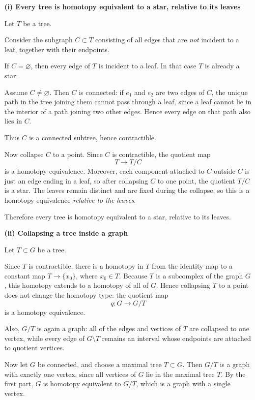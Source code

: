 \begin{solution}

\medskip
\noindent\textbf{(i) Every tree is homotopy equivalent to a star, relative to its leaves}\par
\smallskip

Let \(T\) be a tree.

Consider the subgraph \(C\subset T\) consisting of all edges that are \emph{not} incident to a leaf, together with their endpoints.

If \(C=\varnothing\), then every edge of \(T\) is incident to a leaf. In that case \(T\) is already a star.

Assume \(C\neq \varnothing\). Then \(C\) is connected: if \(e_1\) and \(e_2\) are two edges of \(C\), the unique path in the tree joining them cannot pass through a leaf, since a leaf cannot lie in the interior of a path joining two other edges. Hence every edge on that path also lies in \(C\).

Thus \(C\) is a connected subtree, hence contractible.

Now collapse \(C\) to a point. Since \(C\) is contractible, the quotient map
\[
T \longrightarrow T/C
\]
is a homotopy equivalence. Moreover, each component attached to \(C\) outside \(C\) is just an edge ending in a leaf, so after collapsing \(C\) to one point, the quotient \(T/C\) is a star. The leaves remain distinct and are fixed during the collapse, so this is a homotopy equivalence \emph{relative to the leaves}.

Therefore every tree is homotopy equivalent to a star, relative to its leaves.


\medskip
\noindent\textbf{(ii) Collapsing a tree inside a graph}\par
\smallskip

Let \(T\subset G\) be a tree.

Since \(T\) is contractible, there is a homotopy in \(T\) from the identity map to a constant map \(T\to \{x_0\}\), where \(x_0\in T\). Because \(T\) is a subcomplex of the graph \(G\), this homotopy extends to a homotopy of all of \(G\). Hence collapsing \(T\) to a point does not change the homotopy type: the quotient map
\[
q:G\longrightarrow G/T
\]
is a homotopy equivalence.

Also, \(G/T\) is again a graph: all of the edges and vertices of \(T\) are collapsed to one vertex, while every edge of \(G\setminus T\) remains an interval whose endpoints are attached to quotient vertices.

Now let \(G\) be connected, and choose a maximal tree \(T\subset G\). Then \(G/T\) is a graph with exactly one vertex, since all vertices of \(G\) lie in the maximal tree \(T\). By the first part, \(G\) is homotopy equivalent to \(G/T\), which is a graph with a single vertex.


\end{solution}
